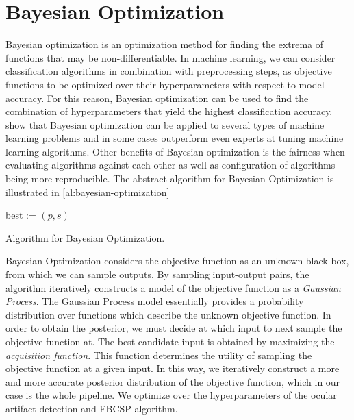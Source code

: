 \section{Bayesian Optimization}\label{sec:bayesian-optimization}
Bayesian optimization is an optimization method for finding the extrema of functions that may be non-differentiable. In machine learning, we can consider classification algorithms in combination with preprocessing steps, as objective functions to be optimized over their hyperparameters with respect to model accuracy. For this reason, Bayesian optimization can be used to find the combination of hyperparameters that yield the highest classification accuracy. \citet{snoek2012practical} show that Bayesian optimization can be applied to several types of machine learning problems and in some cases outperform even experts at tuning machine learning algorithms. Other benefits of Bayesian optimization is the fairness when evaluating algorithms against each other as well as configuration of algorithms being more reproducible.
The abstract algorithm for Bayesian Optimization is illustrated in \cref{al:bayesian-optimization}
\begin{algorithm*}
	best := $(p, s)$   
	\caption{Algorithm for Bayesian Optimization.}
	\label{al:bayesian-optimization}
\end{algorithm*}

Bayesian Optimization considers the objective function as an unknown black box, from which we can sample outputs. By sampling input-output pairs, the algorithm iteratively constructs a model of the objective function as a \emph{Gaussian Process}. The Gaussian Process model essentially provides a probability distribution over functions which describe the unknown objective function. In order to obtain the posterior, we must decide at which input to next sample the objective function at. The best candidate input is obtained by maximizing the \emph{acquisition function}. This function determines the utility of sampling the objective function at a given input. In this way, we iteratively construct a more and more accurate posterior distribution of the objective function, which in our case is the whole pipeline. We optimize over the hyperparameters of the ocular artifact detection and FBCSP algorithm.

